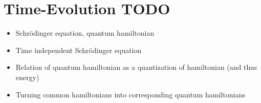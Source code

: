 \section{Time-Evolution TODO}
\begin{itemize}
    \item Schr\"{o}dinger equation, quantum hamiltonian
    \item Time independent Schr\"{o}dinger equation
    \item Relation of quantum hamiltonian as a quantization of hamiltonian (and thus energy)
    \item Turning common hamiltonians into corresponding quantum hamiltonians
\end{itemize}